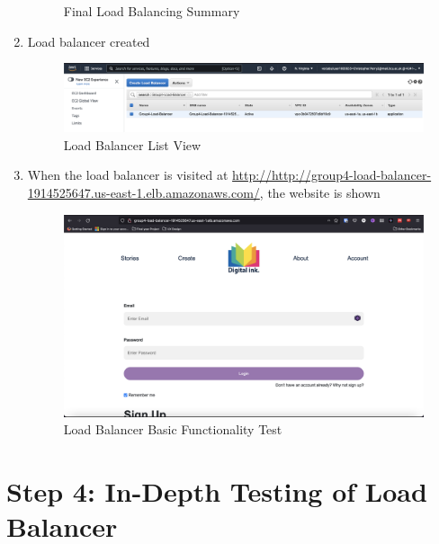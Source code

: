 \begin{enumerate}
\begin{figure}[H]
	      	\caption{Final Load Balancing Summary}
	      	\label{fig:elb-summary}
	      \end{figure}


	\item Load balancer created\nolinebreak
	      \begin{figure}[H]
	      	\centering
	      	\includegraphics[width=\textwidth]{resources/elb/elb-created.png}
	      	\caption{Load Balancer List View}
	      	\label{fig:elb-created}
	      \end{figure}
	\pagebreak
	\item When the load balancer is visited at \href{http://http://group4-load-balancer-1914525647.us-east-1.elb.amazonaws.com/}{http://http://group4-load-balancer-1914525647.us-east-1.elb.amazonaws.com/}, the website is shown\nolinebreak
	      \begin{figure}[H]
	      	\centering
	      	\includegraphics[width=\textwidth]{resources/elb/elb-working.png}
	      	\caption{Load Balancer Basic Functionality Test}
	      	\label{fig:elb-working}
	      \end{figure}
\end{enumerate}
\pagebreak
\section{Step 4: In-Depth Testing of Load Balancer}

